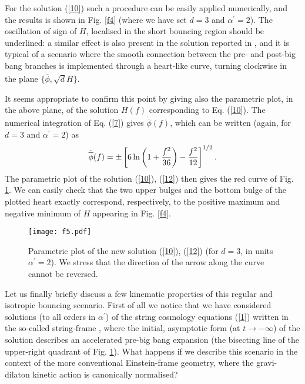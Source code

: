 \documentclass[a4paper,11pt]{article}
\def\beq{\begin{equation}}
\def\eeq{\end{equation}}
\def \ra {\rightarrow}
\def \ap {\alpha^{\prime}}
\def \fb {\overline \phi}
\def \fbp {\dot{\fb}}
\begin{document}
For the solution (\ref{10}) such a procedure can be easily applied numerically, and the results is shown in Fig. \ref{f4} (where we have set $d=3$ and $\ap=2$). The oscillation of sign of $H$, localised in the short bouncing region should be underlined: a similar effect is also present in the solution reported in \cite{2}, and it is typical of a scenario where the smooth connection between the pre- and post-big bang branches is implemented through a heart-like curve, turning clockwise in the plane $\{\fbp, \sqrt d H\}$. 

It seems appropriate to confirm this point by giving also the parametric plot, in the above plane, of the solution $H(f)$ corresponding to Eq. (\ref{10}). The numerical integration of Eq. (\ref{7}) gives $\fbp (f)$, which can be written (again, for $d=3$ and $\ap=2$) as
\beq
\fbp(f) = \pm \left[6 \ln \left(1+\frac{f^2}{36} \right) - {f^2\over 12} \right]^{1/2}. 
\label{12}
\eeq
The parametric plot of the solution (\ref{10}), (\ref{12}) then gives  the red curve of Fig. \ref{f5}. We can easily check that the two upper bulges and the bottom bulge of the plotted heart exactly correspond, respectively, to the positive maximum and negative minimum of $H$ appearing in Fig. \ref{f4}.

\begin{figure}[t]
\centering
\texttt{[image: f5.pdf]}
\caption{Parametric plot of the new solution (\ref{10}), (\ref{12}) (for $d=3$, in units $\ap=2$). We stress that the direction of the arrow along the curve cannot be reversed.}
\label{f5}
\end{figure}
  

Let us finally briefly discuss a few kinematic properties of this regular and isotropic bouncing scenario. 
First of all we notice that we have considered solutions (to all orders in $\ap$) of the string cosmology equations (\ref{1}) written in the so-called string-frame \cite{9}, where the initial, asymptotic form (at $t \ra -\infty$) of the solution describes an accelerated pre-big bang expansion (the bisecting line of the upper-right quadrant of Fig. \ref{f5}). What happens if we describe this scenario in the context of the more conventional Einstein-frame geometry, where the gravi-dilaton kinetic action is canonically normalised?
\end{document}
